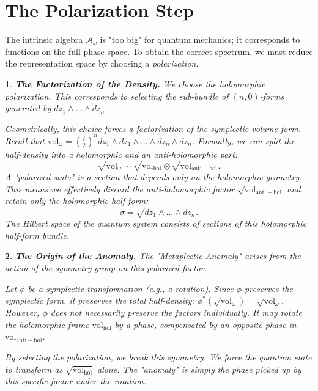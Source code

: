 \documentclass[11pt,reqno,letterpaper,twoside]{amsart}
\theoremstyle{articlestyle}
\newtheorem{article}{}
\theoremstyle{plain}
\theoremstyle{definition}
\def\artlabel[#1]{\textbf{#1.}}
\newcommand{\cA}{{\mathcal A}}
\newcommand{\0}{\hat{0}}
\newcommand{\1}{\hat{1}}
\newcommand{\antihol}{\mathrm{anti-hol}}
\newcommand{\hol}{\mathrm{hol}}
\newcommand{\vol}{\mathrm{vol}}
\begin{document}
  \section{\textbf{The Polarization Step}}
  \label{sec:Polarization}
  
  The intrinsic algebra $\cA_\omega$ is "too big" for quantum mechanics;
  it corresponds to functions on the full phase space.
  To obtain the correct spectrum,
  we must reduce the representation space by choosing a \emph{polarization}.
  
  \begin{article}\artlabel[The Factorization of the Density]
    We choose the \emph{holomorphic polarization}.
    This corresponds to selecting the sub-bundle of $(n,0)$-forms generated by $dz_1 \wedge \dots \wedge dz_n$.
    
    Geometrically,
    this choice forces a factorization of the symplectic volume form.
    Recall that $\vol_\omega = (\frac{i}{2})^n dz_1 \wedge d\bar{z}_1 \wedge \dots \wedge dz_n \wedge d\bar{z}_n$.
    Formally, we can split the half-density into a holomorphic and an anti-holomorphic part:
    $$
      \sqrt{\vol_\omega} \sim \sqrt{\vol_{\hol}} \otimes \sqrt{\vol_{\antihol}}.
      $$
    A "polarized state" is a section that depends only on the holomorphic geometry.
    This means we effectively discard the anti-holomorphic factor $\sqrt{\vol_{\antihol}}$
    and retain only the holomorphic half-form:
    $$
      \sigma = \sqrt{dz_1 \wedge \dots \wedge dz_n}.
      $$
    The Hilbert space of the quantum system consists of sections of this holomorphic half-form bundle.
  \end{article}
  
  \begin{article}\artlabel[The Origin of the Anomaly]
    The "Metaplectic Anomaly" arises from the action of the symmetry group on this polarized factor.
    
    Let $\phi$ be a symplectic transformation (e.g., a rotation).
    Since $\phi$ preserves the symplectic form,
    it preserves the total half-density:
    $\phi^*(\sqrt{\vol_\omega}) = \sqrt{\vol_\omega}$.
    However,
    $\phi$ does \emph{not} necessarily preserve the factors individually.
    It may rotate the holomorphic frame $\vol_{\hol}$ by a phase,
    compensated by an opposite phase in $\vol_{\antihol}$.
    
    By selecting the polarization,
    we break this symmetry.
    We force the quantum state to transform as $\sqrt{\vol_{\hol}}$ alone.
    The "anomaly" is simply the phase picked up by this specific factor under the rotation.
  \end{article}
  
\end{document}
